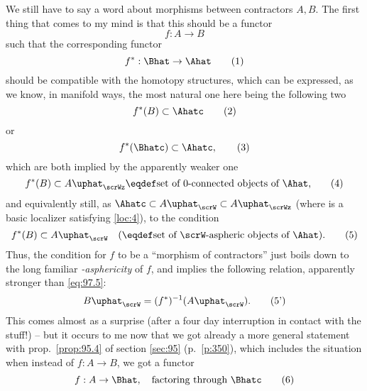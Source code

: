\starsbreak

We still have to say a word about morphisms between contractors $A,
B$. The first thing that comes to my mind is that this should be a
functor
\begin{equation}
  \label{eq:97.0}
  f:A\to B\tag{0}
\end{equation}
such that the corresponding functor
\begin{equation}
  \label{eq:97.1}
  f^*:\Bhat\to\Ahat\tag{1}
\end{equation}
should be compatible with the homotopy structures, which can be
expressed, as we know, in manifold ways, the most natural one here
being the following two
\begin{equation}
  \label{eq:97.2}
  f^*(B) \subset \Ahatc\tag{2}
\end{equation}
or
\begin{equation}
  \label{eq:97.3}
  f^*(\Bhatc) \subset \Ahatc,\tag{3}
\end{equation}
which are both implied by the apparently weaker one
\begin{equation}
  \label{eq:97.4}
  f^*(B) \subset A\uphat_{\scrWz} \eqdef \text{set of $0$-connected
    objects of \Ahat,}\tag{4}
\end{equation}
and equivalently still, as $\Ahatc\subset A\uphat_\scrW\subset
A\uphat_\scrWz$ (where \scrW{} is a basic localizer satisfying
\ref{loc:4}), to the condition
\begin{equation}
  \label{eq:97.5}
  f^*(B)\subset A\uphat_\scrW \quad ( \eqdef \text{set of
    \scrW-aspheric objects of \Ahat}).\tag{5}
\end{equation}
Thus, the condition for $f$ to be a ``morphism of contractors'' just
boils down to the long familiar \emph{\scrW-asphericity} of $f$, and
implies the following relation, apparently stronger than
\eqref{eq:97.5}:
\begin{equation}
  \label{eq:97.5prime}
  B\uphat_\scrW=(f^*)^{-1}(A\uphat_\scrW).\tag{5'}
\end{equation}
This comes almost as a surprise (after a four day interruption in
contact with the stuff!) -- but it occurs to me now that we got
already a more general statement with prop.\ \ref{prop:95.4} of
section \ref{sec:95} (p.\ \ref{p:350}), which includes the
situation when instead of $f:A\to B$, we got a functor
\begin{equation}
  \label{eq:97.6}
  f:A\to \Bhat, \quad\text{factoring through \Bhatc}\tag{6}
\end{equation}

